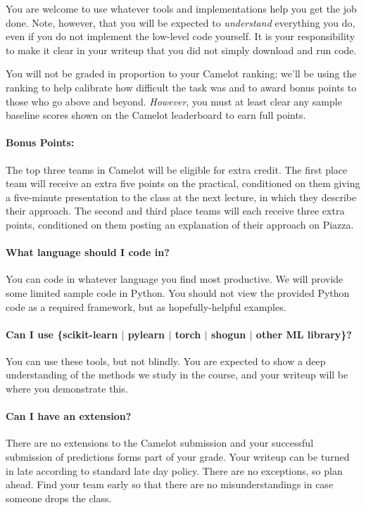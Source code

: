 \documentclass[12pt,letterpaper]{article}
\begin{document}
You are welcome to use whatever tools and implementations help you get
the job done.  Note, however, that you will be expected to
\emph{understand} everything you do, even if you do not implement the
low-level code yourself.  It is your responsibility to make it clear
in your writeup that you did not simply download and run code.


You will not be graded in proportion to your Camelot ranking; we'll be using
the ranking to help calibrate how difficult the task was and to award
bonus points to those who go above and beyond.  \textit{However}, you
must at least clear any sample baseline scores shown on the Camelot
leaderboard to earn full points.


\paragraph{Bonus Points:}
The top three teams in Camelot will be eligible for extra credit.  The
first place team will receive an extra five points on the practical,
conditioned on them giving a five-minute presentation to the class at
the next lecture, in which they describe their approach.  The second
and third place teams will each receive three extra points,
conditioned on them posting an explanation of their approach on
Piazza.

\paragraph{What language should I code in?}
You can code in whatever language you find most productive.  We will
provide some limited sample code in Python.  You should not view the
provided Python code as a required framework, but as hopefully-helpful
examples.

\paragraph{Can I use \{scikit-learn $|$ pylearn $|$ torch $|$ shogun $|$ other ML library\}?}
You can use these tools, but not blindly.  You are expected to show a
deep understanding of the methods we study in the course, and your
writeup will be where you demonstrate this.

\paragraph{Can I have an extension?}
There are no extensions to the Camelot submission and your successful
submission of predictions forms part of your grade.  Your writeup can
be turned in late according to standard late day policy.  There are no
exceptions, so plan ahead.  Find your team early so that there are no
misunderstandings in case someone drops the class.
\end{document}
